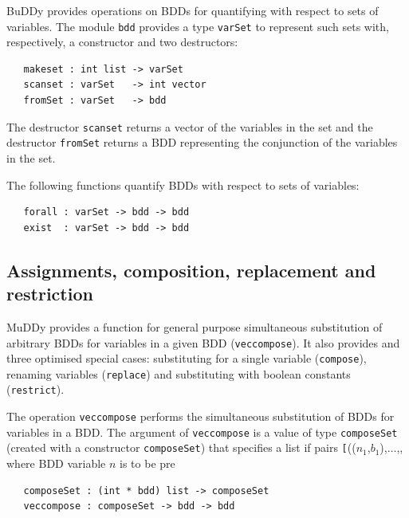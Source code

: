 \documentclass[12pt,fleqn]{article}
\renewcommand{\t}[1]{\mbox{\tt #1}}
\newcommand{\Buddy}{BuDDy{}}
\newcommand{\Muddy}{MuDDy{}}
\begin{document}
\Buddy{} provides operations on BDDs for quantifying with respect to sets
of variables. The module  \t{bdd} provides a type \t{varSet} to represent such
sets with, respectively, a constructor and two destructors:

\begin{verbatim}
   makeset : int list -> varSet
   scanset : varSet   -> int vector
   fromSet : varSet   -> bdd
\end{verbatim}

The destructor \t{scanset} returns a vector of the variables in the
set and the destructor \t{fromSet} returns a BDD representing the
conjunction of the variables in the set.

The following functions quantify BDDs with respect to sets of variables:

\begin{verbatim}
   forall : varSet -> bdd -> bdd
   exist  : varSet -> bdd -> bdd
\end{verbatim}

\subsection{Assignments, composition, replacement and restriction}\label{replace}

\Muddy{} provides a function for general purpose simultaneous
substitution of arbitrary BDDs for variables in a given BDD (\t{veccompose}). It also
provides and three optimised special cases: substituting for a single
variable (\t{compose}), renaming variables (\t{replace}) and
substituting with boolean constants (\t{restrict}).

The operation \t{veccompose} performs the simultaneous substitution 
of BDDs for variables in a BDD. The argument of \t{veccompose}
is a value of type \t{composeSet}
(created with a constructor \t{composeSet})
that specifies a list if pairs \t[(($n_1$,$b_1$),$\ldots$,, where BDD variable $n$ is to be pre

\begin{verbatim}
   composeSet : (int * bdd) list -> composeSet
   veccompose : composeSet -> bdd -> bdd
\end{verbatim}
\end{document}
